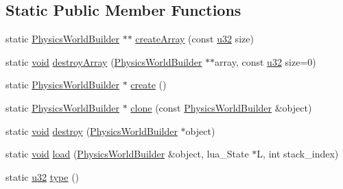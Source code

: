 \subsection*{Static Public Member Functions}
\begin{DoxyCompactItemize}
\item 
static \mbox{\hyperlink{classnjli_1_1_physics_world_builder}{Physics\+World\+Builder}} $\ast$$\ast$ \mbox{\hyperlink{classnjli_1_1_physics_world_builder_aa8d4ae1e621ca869d29d09d6f619cd72}{create\+Array}} (const \mbox{\hyperlink{_util_8h_a10e94b422ef0c20dcdec20d31a1f5049}{u32}} size)
\item 
static \mbox{\hyperlink{_thread_8h_af1e856da2e658414cb2456cb6f7ebc66}{void}} \mbox{\hyperlink{classnjli_1_1_physics_world_builder_a96ea933d2e5c36b92152c0489f3a707e}{destroy\+Array}} (\mbox{\hyperlink{classnjli_1_1_physics_world_builder}{Physics\+World\+Builder}} $\ast$$\ast$array, const \mbox{\hyperlink{_util_8h_a10e94b422ef0c20dcdec20d31a1f5049}{u32}} size=0)
\item 
static \mbox{\hyperlink{classnjli_1_1_physics_world_builder}{Physics\+World\+Builder}} $\ast$ \mbox{\hyperlink{classnjli_1_1_physics_world_builder_a9171c619f9b0695b9051ae8e770ea4fc}{create}} ()
\item 
static \mbox{\hyperlink{classnjli_1_1_physics_world_builder}{Physics\+World\+Builder}} $\ast$ \mbox{\hyperlink{classnjli_1_1_physics_world_builder_a7f4d93d89d71f063f9a5c1b4906aaf16}{clone}} (const \mbox{\hyperlink{classnjli_1_1_physics_world_builder}{Physics\+World\+Builder}} \&object)
\item 
static \mbox{\hyperlink{_thread_8h_af1e856da2e658414cb2456cb6f7ebc66}{void}} \mbox{\hyperlink{classnjli_1_1_physics_world_builder_a140d1567c171389e8dfadfef72d23335}{destroy}} (\mbox{\hyperlink{classnjli_1_1_physics_world_builder}{Physics\+World\+Builder}} $\ast$object)
\item 
static \mbox{\hyperlink{_thread_8h_af1e856da2e658414cb2456cb6f7ebc66}{void}} \mbox{\hyperlink{classnjli_1_1_physics_world_builder_afe65933657d8cc22800bfe0104aecb62}{load}} (\mbox{\hyperlink{classnjli_1_1_physics_world_builder}{Physics\+World\+Builder}} \&object, lua\+\_\+\+State $\ast$L, int stack\+\_\+index)
\item 
static \mbox{\hyperlink{_util_8h_a10e94b422ef0c20dcdec20d31a1f5049}{u32}} \mbox{\hyperlink{classnjli_1_1_physics_world_builder_a0ce1bd1ee43207d33c421d3d2af1ed3b}{type}} ()
\end{DoxyCompactItemize}
